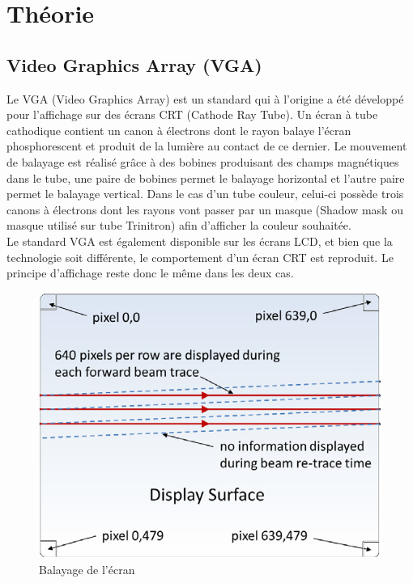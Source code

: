 \section{Théorie}
\subsection{Video Graphics Array (VGA)}
Le VGA (Video Graphics Array) est un standard qui à l'origine a été développé pour l'affichage sur des écrans CRT (Cathode Ray Tube). Un écran à tube cathodique contient un canon à électrons dont le rayon balaye l'écran phosphorescent et produit de la lumière au contact de ce dernier. Le mouvement de balayage est réalisé grâce à des bobines produisant des champs magnétiques dans le tube, une paire de bobines permet le balayage horizontal et l'autre paire permet le balayage vertical. Dans le cas d'un tube couleur, celui-ci possède trois canons à électrons dont les rayons vont passer par un masque (Shadow mask ou masque utilisé sur tube Trinitron) afin d'afficher la couleur souhaitée.\\

Le standard VGA est également disponible sur les écrans LCD, et bien que la technologie soit différente, le comportement d'un écran CRT est reproduit. Le principe d'affichage reste donc le même dans les deux cas.\\

\begin{figure}[h!]
	\centering
	\includegraphics[scale=0.6]{images/scan.png}
	\caption{Balayage de l'écran \cite{cite:scan}}
	\label{fig:scan}
\end{figure}

